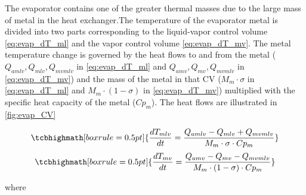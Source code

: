 The evaporator contains one of the greater thermal masses due to the large mass of metal in the heat exchanger.The temperature of the evaporator metal is divided into two parts corresponding to the liquid-vapor control volume \cref{eq:evap_dT_ml} and the vapor control volume \cref{eq:evap_dT_mv}. The metal temperature change is governed by the heat flows to and from the metal ($ Q_{amlv}, Q_{mlv}, Q_{mvmlv} $ in \cref{eq:evap_dT_ml} and $ Q_{amv}, Q_{mv}, Q_{mvmlv} $ in \cref{eq:evap_dT_mv}) and the mass of the metal in that CV ($M_m \cdot \sigma$ in \cref{eq:evap_dT_ml} and $M_m \cdot (1 - \sigma)$ in \cref{eq:evap_dT_mv}) multiplied with the specific heat capacity of the metal ($Cp_m$). The heat flows are illustrated in \cref{fig:evap_CV}


\begin{equation}
	\tcbhighmath[boxrule = 0.5pt]{ 	\frac{dT_{mlv}}{dt}  = \frac{Q_{amlv}-Q_{mlv} + Q_{mvmlv}}{M_m \cdot \sigma \cdot Cp_m}  }    \label{eq:evap_dT_ml}
\end{equation}
\begin{equation}
	\tcbhighmath[boxrule = 0.5pt]{ \frac{dT_{mv}}{dt} = \frac{Q_{amv} - Q_{mv} - Q_{mvmlv}}{M_m \cdot (1 - \sigma) \cdot Cp_m } }     \label{eq:evap_dT_mv}
\end{equation}



where

